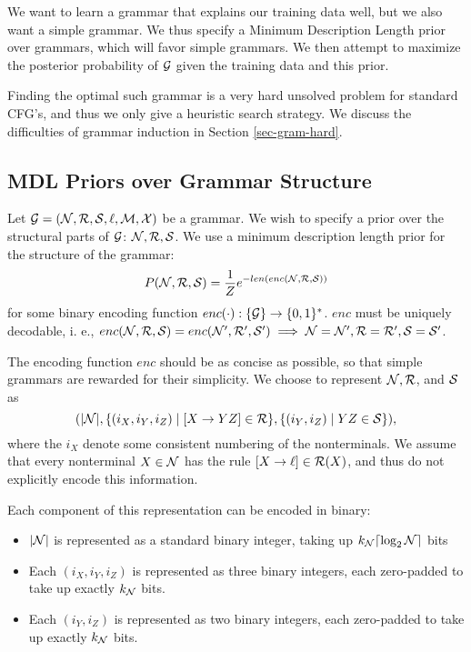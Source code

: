 

We want to learn a grammar that explains our training data well, but
we also want a simple grammar. We thus specify a Minimum Description
Length prior over grammars, which will favor simple grammars. We then
attempt to maximize the posterior probability of ${\mathcal G}$ given the
training data and this prior.

Finding the optimal such grammar is a very hard unsolved problem for
standard CFG's, and thus we only give a heuristic search strategy.  We
discuss the difficulties of grammar induction in Section \ref{sec-gram-hard}.

\subsection{MDL Priors over Grammar Structure}
\label{sec-mdl}

Let ${\mathcal G}=({\mathcal N},{\mathcal R},{\mathcal S},\ell,{\mathcal M},{\mathcal X})$ be a grammar. We wish to
specify a prior over the structural parts of ${\mathcal G}$: ${\mathcal N}, {\mathcal R},
{\mathcal S}$. We use a minimum description length prior for the structure of
the grammar:
$$P({\mathcal N},{\mathcal R},{\mathcal S}) = \frac{1}{Z} e^{-len(enc({\mathcal N},{\mathcal R},{\mathcal S}))}$$
for some binary encoding function $enc(\cdot): \{{\mathcal G}\} \to
\{0,1\}^*$. $enc$ must be uniquely decodable, i. e.,
$enc({\mathcal N},{\mathcal R},{\mathcal S}) = enc({\mathcal N}',{\mathcal R}',{\mathcal S}') \implies {\mathcal N}={\mathcal N}',
{\mathcal R}={\mathcal R}', {\mathcal S}={\mathcal S}'$.

The encoding function $enc$ should be as concise as possible, so that
simple grammars are rewarded for their simplicity.  We choose to
represent ${\mathcal N}, {\mathcal R}$, and ${\mathcal S}$ as
$$(|{\mathcal N}|, \{(i_X,i_Y,i_Z) \mid [X\to YZ] \in {\mathcal R}\}, \{(i_Y,i_Z) \mid
YZ\in {\mathcal S} \} ),$$ where the $i_X$ denote some consistent numbering of
the nonterminals. We assume that every nonterminal $X\in {\mathcal N}$ has the
rule $[X\to \ell] \in {\mathcal R}(X)$, and thus do not explicitly encode this
information.

Each component of this representation can be encoded in binary:
\begin{itemize}
\item $|{\mathcal N}|$ is represented as a standard binary integer, taking up
  $k_{\mathcal N} \lceil \log_2 {\mathcal N} \rceil$ bits
\item Each $(i_X, i_Y, i_Z)$ is represented as three binary integers,
  each zero-padded to take up exactly $k_{\mathcal N}$ bits.
\item Each $(i_Y, i_Z)$ is represented as two binary integers, each
  zero-padded to take up exactly $k_{\mathcal N}$ bits.
\end{itemize}

